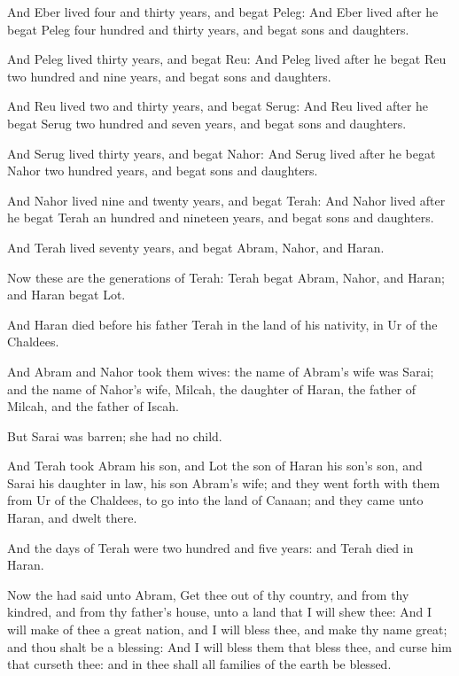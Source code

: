 \Verse And Eber lived four and thirty years, and begat Peleg: \Verse And Eber lived after he begat Peleg four hundred and thirty years, and begat sons and daughters.

\Verse And Peleg lived thirty years, and begat Reu: \Verse And Peleg lived after he begat Reu two hundred and nine years, and begat sons and daughters.

\Verse And Reu lived two and thirty years, and begat Serug: \Verse And Reu lived after he begat Serug two hundred and seven years, and begat sons and daughters.

\Verse And Serug lived thirty years, and begat Nahor: \Verse And Serug lived after he begat Nahor two hundred years, and begat sons and daughters.

\Verse And Nahor lived nine and twenty years, and begat Terah: \Verse And Nahor lived after he begat Terah an hundred and nineteen years, and begat sons and daughters.

\Verse And Terah lived seventy years, and begat Abram, Nahor, and Haran.

\Verse Now these are the generations of Terah: Terah begat Abram, Nahor, and Haran; and Haran begat Lot.

\Verse And Haran died before his father Terah in the land of his nativity, in Ur of the Chaldees.

\Verse And Abram and Nahor took them wives: the name of Abram's wife was Sarai; and the name of Nahor's wife, Milcah, the daughter of Haran, the father of Milcah, and the father of Iscah.

\Verse But Sarai was barren; she had no child.

\Verse And Terah took Abram his son, and Lot the son of Haran his son's son, and Sarai his daughter in law, his son Abram's wife; and they went forth with them from Ur of the Chaldees, to go into the land of Canaan; and they came unto Haran, and dwelt there.

\Verse And the days of Terah were two hundred and five years: and Terah died in Haran.

\Chapter
\Verse Now the \LORD had said unto Abram, Get thee out of thy country, and from thy kindred, and from thy father's house, unto a land that I will shew thee: \Verse And I will make of thee a great nation, and I will bless thee, and make thy name great; and thou shalt be a blessing: \Verse And I will bless them that bless thee, and curse him that curseth thee: and in thee shall all families of the earth be blessed.

